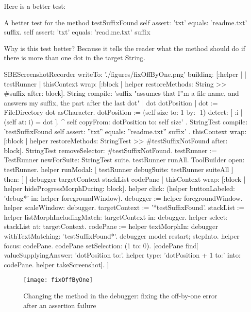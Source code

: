 \documentclass[a4paper,10pt,twoside]{book}
\begin{document}
Here is a better test:

\begin{method}[testSuffix2]{A better test for the  method}
testSuffixFound
	self assert: 'txt' equals: 'readme.txt' suffix.
	self assert: 'txt' equals: 'read.me.txt' suffix
\end{method}
\noindent
Why is this test better?  Because it tells the reader what the method should do if there is more than one dot in the target String.


\begin{ExecuteSmalltalkScript}
SBEScreenshotRecorder writeTo: './figures/fixOffByOne.png' building: [:helper |
	| testRunner |
	thisContext wrap: [:block | helper restoreMethods: {String >> #suffix} after: block].
	String compile: 'suffix
"assumes that I''m a file name, and answers my suffix, the part after the last dot"
| dot dotPosition |
dot := FileDirectory dot asCharacter.
dotPosition := (self size to: 1 by: -1) detect: [ :i | (self at: i) = dot ].
^ self copyFrom: dotPosition to: self size'
.
	StringTest compile: 'testSuffixFound
self assert: ''txt'' equals: ''readme.txt'' suffix'
.
	thisContext wrap: [:block | helper restoreMethods: {StringTest >> #testSuffixNotFound} after: block].
	StringTest removeSelector: #testSuffixNotFound.
	testRunner := TestRunner newForSuite: StringTest suite.
	testRunner runAll.
	ToolBuilder open: testRunner.
	helper
		runModal: [ testRunner debugSuite: testRunner suiteAll ]
		then: [
			| debugger targetContext stackList codePane |
			thisContext wrap: [:block | helper hideProgressMorphDuring: block].
			helper click: (helper buttonLabeled: 'debug*' in: helper foregroundWindow).
			debugger := helper foregroundWindow.
			helper scaleWindow: debugger.
			targetContext := '*testSuffixFound'.
			stackList := helper listMorphIncludingMatch: targetContext in: debugger.
			helper select: stackList at: targetContext.
			codePane := helper textMorphIn: debugger withTextMatching: 'testSuffixFound*'.
			debugger model restart; stepInto.
			helper focus: codePane.
			codePane setSelection: (1 to: 0).
			[codePane find]
				valueSupplyingAnswer: 'dotPosition to:'.
			helper type: 'dotPosition + 1 to:' into: codePane.
			helper takeScreenshot].
]
\end{ExecuteSmalltalkScript}
\begin{figure}[btp]
	\begin{center}
		\texttt{[image: fixOffByOne]}
	\end{center}
	\caption{Changing the  method in the debugger: fixing the off-by-one error after an \sunit assertion failure}
	\label{fig:fixOffByOne}
\end{figure}
\end{document}
